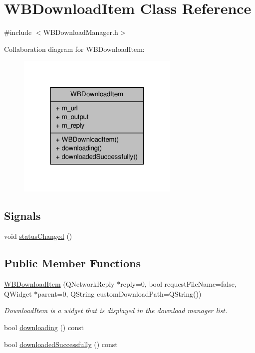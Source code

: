 \hypertarget{class_w_b_download_item}{\section{W\-B\-Download\-Item Class Reference}
\label{d1/d7a/class_w_b_download_item}
}


{\ttfamily \#include $<$W\-B\-Download\-Manager.\-h$>$}



Collaboration diagram for W\-B\-Download\-Item\-:
\nopagebreak
\begin{figure}[H]
\begin{center}
\leavevmode
\includegraphics[width=220pt]{d6/d9d/class_w_b_download_item__coll__graph}
\end{center}
\end{figure}
\subsection*{Signals}
\begin{DoxyCompactItemize}
\item 
void \hyperlink{class_w_b_download_item_a01e7e68de330f4d2621ebfd709800072}{status\-Changed} ()
\end{DoxyCompactItemize}
\subsection*{Public Member Functions}
\begin{DoxyCompactItemize}
\item 
\hyperlink{class_w_b_download_item_ae98363fcd3077100e78b528eb931efbf}{W\-B\-Download\-Item} (Q\-Network\-Reply $\ast$reply=0, bool request\-File\-Name=false, Q\-Widget $\ast$parent=0, Q\-String custom\-Download\-Path=Q\-String())
\begin{DoxyCompactList}\small\item\em Download\-Item is a widget that is displayed in the download manager list. \end{DoxyCompactList}\item 
bool \hyperlink{class_w_b_download_item_a8fabeb71f2281ea7853f9b814a830650}{downloading} () const 
\item 
bool \hyperlink{class_w_b_download_item_aceb7546f21a0887150bc21d20b3a45f8}{downloaded\-Successfully} () const 
\end{DoxyCompactItemize}
